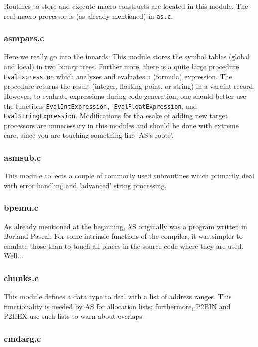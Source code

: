 \documentclass[12pt,twoside]{report}
\newcommand{\tty}[1]{{\tt #1}}
\begin{document}
Routines to store and execute macro constructs are located in this module.
The real macro processor is (as already mentioned) in {\tt as.c}.

\subsubsection{asmpars.c}

Here we really go into the innards: This module stores the symbol tables
(global and local) in two binary trees.  Further more, there is a quite
large procedure {\tt EvalExpression} which analyzes and evaluates a (formula)
expression.  The procedure returns the result (integer, floating point, or
string) in a varaint record.  However, to evaluate expressions during code
generation, one should better use the functions  \tty{EvalIntExpression,
EvalFloatExpression}, and \tty{EvalStringExpression}.  Modifications for
tha esake of adding new target processors are unnecessary in this modules
and should be done with extreme care, since you are touching something
like 'AS's roots'.

\subsubsection{asmsub.c}

This module collects a couple of commonly used subroutines which primarily
deal with error handling and 'advanced' string processing.

\subsubsection{bpemu.c}

As already mentioned at the beginning, AS originally was a program written
in Borland Pascal.  For some intrinsic functions of the compiler, it was
simpler to emulate those than to touch all places in the source code where
they are used.  Well...

\subsubsection{chunks.c}

This module defines a data type to deal with a list of address ranges.
This functionality is needed by AS for allocation lists; furthermore,
P2BIN and P2HEX use such lists to warn about overlaps.

\subsubsection{cmdarg.c}
\end{document}
